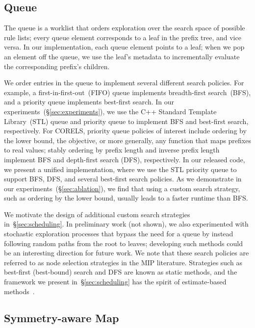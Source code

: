 \documentclass[twoside,11pt]{article}
\begin{document}
\subsection{Queue}
\label{sec:queue}

The queue is a worklist that orders exploration over the search space of possible
rule lists; every queue element corresponds to a leaf in the prefix tree, and vice versa.
%
In our implementation, each queue element points to a leaf;
when we pop an element off the queue, we use the leaf's metadata to
incrementally evaluate the corresponding prefix's children.

We order entries in the queue to implement several different search policies.
%
For example, a first-in-first-out~(FIFO) queue implements breadth-first search~(BFS),
and a priority queue implements best-first search.
%
In our experiments~(\S\ref{sec:experiments}), we use the C++ Standard Template Library~(STL)
queue and priority queue to implement BFS and best-first search, respectively.
%
For CORELS, priority queue policies of interest include ordering by the lower bound,
the objective, or more generally, any function that maps prefixes to real values;
stably ordering by prefix length and inverse prefix length implement
BFS and depth-first search (DFS), respectively.
%
In our released code, we present a unified implementation,
where we use the STL priority queue to support BFS, DFS,
and several best-first search policies.
%
As we demonstrate in our experiments~(\S\ref{sec:ablation}),
we find that using a custom search strategy,
such as ordering by the lower bound, usually leads to a faster runtime than BFS.

We motivate the design of additional custom search strategies in~\S\ref{sec:scheduling}.
%
In preliminary work (not shown), we also experimented with
stochastic exploration processes that bypass the need for a queue
by instead following random paths from the root to leaves;
developing such methods could be an interesting direction for future work.
%
We note that these search policies are referred to as node selection strategies
in the MIP literature.
%
Strategies such as best-first (best-bound) search and DFS are known as static methods, and the framework we present in~\S\ref{sec:scheduling}
has the spirit of estimate-based methods~\citep{Linderoth1999}.

\subsection{Symmetry-aware Map}
\label{sec:pmap}
\end{document}

